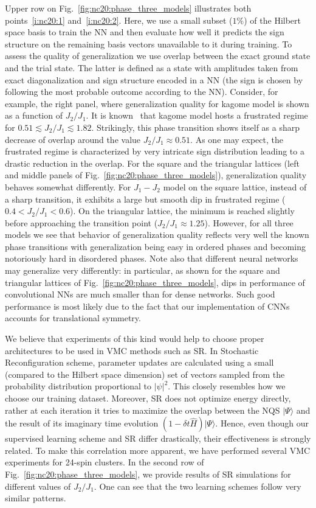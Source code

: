 Upper row on Fig.~\ref{fig:nc20:phase_three_models} illustrates both points~\ref{i:nc20:1} and~\ref{i:nc20:2}. Here, we use a small subset ($1\%$) of the Hilbert space basis to train the NN and then evaluate how well it predicts the sign structure on the remaining basis vectors unavailable to it during training. To assess the quality of generalization we use overlap between the exact ground state and the trial state. The latter is defined as a state with amplitudes taken from exact diagonalization and sign structure encoded in a NN (the sign is chosen by following the most probable outcome according to the NN). Consider, for example, the right panel, where generalization quality for kagome model is shown as a function of $J_2/J_1$. It is known~\cite{li2012spin} that kagome model hosts a frustrated regime for $0.51\lesssim J_2/J_1 \lesssim 1.82$. Strikingly, this phase transition shows itself as a sharp decrease of overlap around the value $J_2/J_1\approx 0.51$. As one may expect, the frustrated regime is characterized by very intricate sign distribution leading to a drastic reduction in the overlap. For the square and the triangular lattices (left and middle panels of Fig.~\ref{fig:nc20:phase_three_models}), generalization quality behaves somewhat differently. For $J_1-J_2$ model on the square lattice, instead of a sharp transition, it exhibits a large but smooth dip in frustrated regime ($0.4<J_2/J_1<0.6$). On the triangular lattice, the minimum is reached slightly before approaching the transition point ($J_2/J_1\approx1.25$). However, for all three models we see that behavior of generalization quality reflects very well the known phase transitions with generalization being easy in ordered phases and becoming notoriously hard in disordered phases. Note also that different neural networks may generalize very differently: in particular, as shown for the square and triangular lattices of Fig.~\ref{fig:nc20:phase_three_models}, dips in performance of convolutional NNs are much smaller than for dense networks. Such good performance is most likely due to the fact that our implementation of CNNs accounts for translational symmetry. %

We believe that experiments of this kind would help to choose proper architectures to be used in VMC methods such as SR. In Stochastic Reconfiguration scheme, parameter updates are calculated using a small (compared to the Hilbert space dimension) set of vectors sampled from the probability distribution proportional to $|\psi|^2$. This closely resembles how we choose our training dataset. Moreover, SR does not optimize energy directly, rather at each iteration it tries to maximize the overlap between the NQS $|\Psi\rangle$ and the result of its imaginary time evolution $(1- \delta t \hat{H})|\Psi\rangle$. Hence, even though our supervised learning scheme and SR differ drastically, their effectiveness is strongly related. To make this correlation more apparent, we have performed several VMC experiments for 24-spin clusters. In the second row of Fig.~\ref{fig:nc20:phase_three_models}, we provide results of SR simulations for different values of $J_2/J_1$. One can see that the two learning schemes follow very similar patterns.


